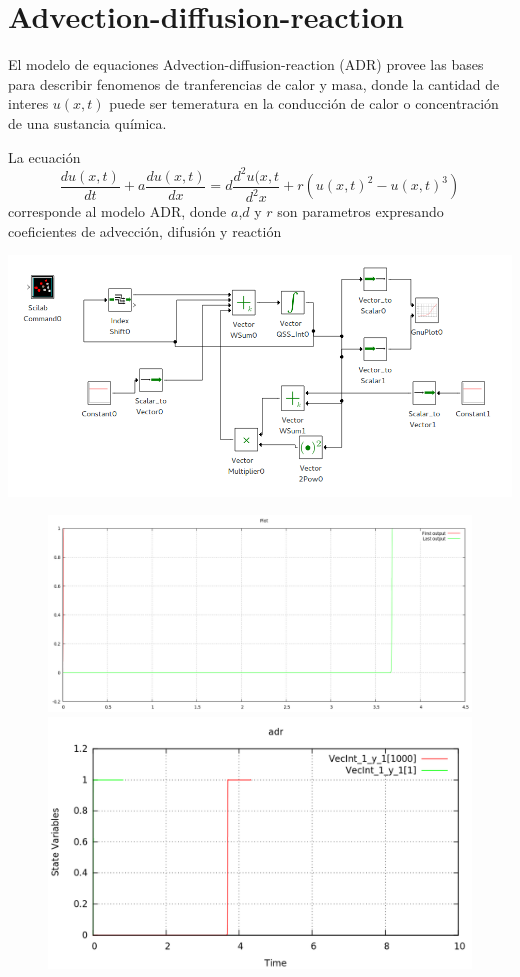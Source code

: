 \section{Advection-diffusion-reaction}
	El modelo de equaciones Advection-diffusion-reaction (ADR) provee las bases para describir fenomenos de tranferencias de calor y masa, donde la cantidad de interes $u(x,t)$ puede ser temeratura en la conducción de calor o concentración de una sustancia química.

La ecuación 
\begin{equation*}
\frac{du(x,t)}{dt} + a \frac{du(x,t)}{dx} = d\frac{d^2u(x,t}{d^2x} + r(u(x,t)^2 - u(x,t)^3)
\end{equation*}
corresponde al modelo ADR, donde $a$,$d$ y $r$ son parametros expresando coeficientes de advección, difusión y reactión

 \includegraphics[width=0.75\linewidth]{adr-pwd}

\begin{figure}[H]
\centering
\begin{minipage}{0.5\textwidth}
\centering
 \includegraphics[width=\linewidth]{adr-pd}
\end{minipage}\hfill
\begin{minipage}{0.5\textwidth}
\centering
 \includegraphics[width=\linewidth]{adr-qss}
\end{minipage}
\end{figure}


